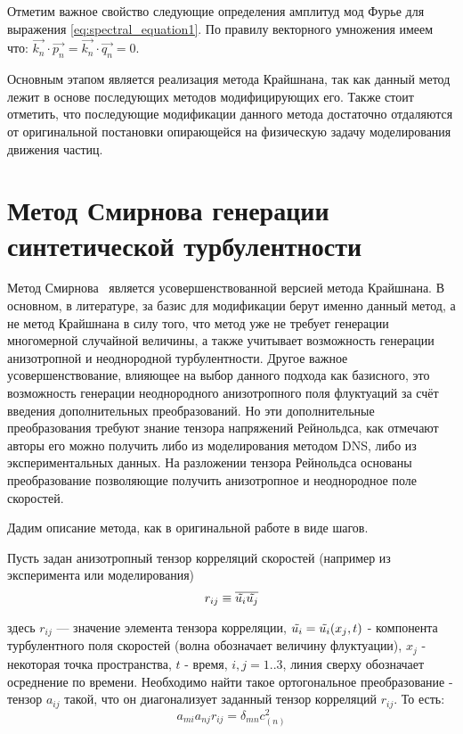 Отметим важное свойство следующие определения амплитуд мод Фурье для выражения \eqref{eq:spectral_equation1}. По правилу векторного умножения имеем что: $\vec{k_n} \cdot \vec{p_n} = \vec{k_n} \cdot \vec{q_n} = 0$. 

Основным этапом является реализация метода Крайшнана, так как данный метод лежит в основе последующих методов модифицирующих его. Также стоит отметить, что последующие модификации данного метода достаточно отдаляются от оригинальной постановки опирающейся на физическую задачу моделирования движения частиц.

\section{Метод Смирнова генерации синтетической турбулентности} \label{sect2_2}
Метод Смирнова~\cite{Smirnov2001} является усовершенствованной версией метода Крайшнана. 
В основном, в литературе, за базис для модификации берут именно данный метод, а не метод Крайшнана в силу того, что метод уже не требует генерации многомерной случайной величины, 
а также учитывает возможность генерации анизотропной и неоднородной турбулентности. 
Другое важное усовершенствование, влияющее на выбор данного подхода как базисного, это возможность генерации неоднородного анизотропного поля флуктуаций за счёт введения дополнительных преобразований. 
Но эти дополнительные преобразования требуют знание тензора напряжений Рейнольдса, как отмечают авторы его можно получить либо из моделирования методом DNS, либо из экспериментальных данных. На разложении тензора Рейнольдса основаны преобразование позволяющие получить анизотропное и неоднородное поле скоростей. 


Дадим описание метода, как в оригинальной работе в виде шагов.

Пусть задан анизотропный тензор корреляций скоростей (например из эксперимента или моделирования)
\begin{equation}
  \label{eq:spectral_equation3}
    r_{ij} \equiv \overline{\Tilde{u_i} \Tilde{u_j}}
\end{equation}

здесь $r_{ij}$ — значение элемента тензора корреляции, $\Tilde{u_i} = \Tilde{u_i}(x_j, t)$ - компонента турбулентного поля скоростей (волна обозначает величину флуктуации), $x_j$ - некоторая точка пространства, $t$ - время, $i,j=1..3$, линия сверху обозначает осреднение по времени. 
Необходимо найти такое ортогональное преобразование - тензор $a_{ij}$ такой, что он диагонализует заданный тензор корреляций $r_{ij}$. То есть:
\begin{equation}
  \label{eq:spectral_equation4}
    a_{mi} a_{nj} r_{ij} = \delta_{mn} c^2_(n)
\end{equation}

